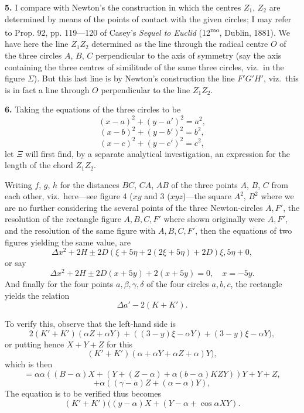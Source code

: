 \documentclass[11pt,a4paper]{article}
\begin{document}
\textbf{5.} I compare with Newton's the construction in which the centres $Z_1$, $Z_2$ are determined by means of the points of contact with the given circles; I may refer to Prop. 92, pp. 119---120 of Casey's \textit{Sequel to Euclid} (12\textsuperscript{mo}, Dublin, 1881). We have here the line $Z_1 Z_2$ determined as the line through the radical centre $O$ of the three circles $A$, $B$, $C$ perpendicular to the axis of symmetry (say the axis containing the three centres of similitude of the same three circles, viz.\ in the figure $\Sigma$). But this last line is by Newton's construction the line $F'G'H'$, viz.\ this is in fact a line through $O$ perpendicular to the line $Z_1 Z_2$.

\textbf{6.} Taking the equations of the three circles to be
\[
(x - a)^2 + (y - a')^2 = a^2,
\]
\[
(x - b)^2 + (y - b')^2 = b^2,
\]
\[
(x - c)^2 + (y - c')^2 = c^2,
\]
let $\Xi$ will first find, by a separate analytical investigation, an expression for the length of the chord $Z_1 Z_2$.

Writing $f$, $g$, $h$ for the distances $BC$, $CA$, $AB$ of the three points $A$, $B$, $C$ from each other, viz.\ here---see figure 4 ($xy$ and 3 ($xyz$)---the square $A^2$, $B^2$ where we are no further considering the several points of the three Newton-circles $A, F'$, the resolution of the rectangle figure $A, B, C, F'$ where shown originally were $A, F'$, and the resolution of the same figure with $A, B, C, F'$, then the equations of two figures yielding the same value, are
\[
\Delta x^2 + 2H \pm 2D (\xi + 5\eta + 2(2\xi + 5\eta) + 2D)\xi, 5\eta + 0,
\]
or say
\[
\Delta x^2 + 2H \pm 2D (x + 5y) + 2(x + 5y) = 0, \quad x = -5y.
\]
And finally for the four points $a, \beta, \gamma, \delta$ of the four circles $a, b, c$, the rectangle yields the relation
\[
\Delta a' - 2(K + K').
\]

To verify this, observe that the left-hand side is
\[
2(K' + K')(\alpha Z + \alpha Y) + ((3 - y)\xi - \alpha Y) + (3 - y)\xi - \alpha Y),
\]
or putting hence $X + Y + Z$ for this
\[
(K' + K')(\alpha + \alpha Y + \alpha Z + \alpha) Y),
\]
which is then
\[
= \alpha\alpha ((B - \alpha)X + (Y + (Z - \alpha) + \alpha(b - \alpha)KZ Y) ) Y + Y + Z,
\]
\[
+ \alpha((\gamma - a)Z + (\alpha - \alpha)Y),
\]
The equation is to be verified thus becomes
\[
(K' + K')((y - \alpha)X + (Y - \alpha + \cos \alpha XY).
\]
\end{document}
